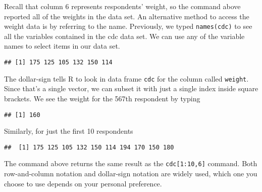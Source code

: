 \documentclass[]{article}
\newenvironment{Shaded}{\begin{snugshade}}{\end{snugshade}}
\newcommand{\KeywordTok}[1]{\textcolor[rgb]{0.13,0.29,0.53}{\textbf{#1}}}
\newcommand{\DecValTok}[1]{\textcolor[rgb]{0.00,0.00,0.81}{#1}}
\newcommand{\OperatorTok}[1]{\textcolor[rgb]{0.81,0.36,0.00}{\textbf{#1}}}
\newcommand{\NormalTok}[1]{#1}
\begin{document}
Recall that column 6 represents respondents' weight, so the command
above reported all of the weights in the data set. An alternative method
to access the weight data is by referring to the name. Previously, we
typed \texttt{names(cdc)} to see all the variables contained in the cdc
data set. We can use any of the variable names to select items in our
data set.

\begin{Shaded}
\end{Shaded}

\begin{verbatim}
## [1] 175 125 105 132 150 114
\end{verbatim}

The dollar-sign tells R to look in data frame \texttt{cdc} for the
column called \texttt{weight}. Since that's a single vector, we can
subset it with just a single index inside square brackets. We see the
weight for the 567th respondent by typing

\begin{Shaded}
\end{Shaded}

\begin{verbatim}
## [1] 160
\end{verbatim}

Similarly, for just the first 10 respondents

\begin{Shaded}
\end{Shaded}

\begin{verbatim}
##  [1] 175 125 105 132 150 114 194 170 150 180
\end{verbatim}

The command above returns the same result as the
\texttt{cdc{[}1:10,6{]}} command. Both row-and-column notation and
dollar-sign notation are widely used, which one you choose to use
depends on your personal preference.
\end{document}
